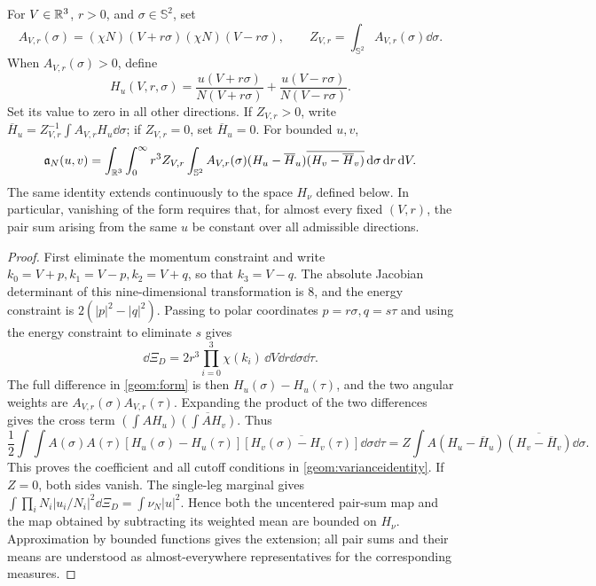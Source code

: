 \begin{proposition}\label{geom:pairedvariance}
For $V\in\mathbb R^3$, $r>0$, and $\sigma\in\mathbb S^2$, set
\[
 A_{V,r}(\sigma)=(\chi N)(V+r\sigma)(\chi N)(V-r\sigma),
 \qquad Z_{V,r}=\int_{\mathbb S^2}A_{V,r}(\sigma)\dd\sigma.
\]
When $A_{V,r}(\sigma)>0$, define
\[
 H_u(V,r,\sigma)=\frac{u(V+r\sigma)}{N(V+r\sigma)}
                         +\frac{u(V-r\sigma)}{N(V-r\sigma)}.
\]
Set its value to zero in all other directions. If $Z_{V,r}>0$, write
$\overline H_u=Z_{V,r}^{-1}\int A_{V,r}H_u\dd\sigma$;
if $Z_{V,r}=0$, set $\overline H_u=0$.
For bounded $u,v$,
\begin{equation}\label{geom:varianceidentity}
 \mathfrak a_N(u,v)=
 \int_{\mathbb R^3}\int_0^\infty r^3Z_{V,r}
       \int_{\mathbb S^2}A_{V,r}(\sigma)
       (H_u-\overline H_u)\overline{(H_v-\overline H_v)}
                    \,\mathrm d\sigma\,\mathrm d r\,\mathrm d V.
\end{equation}
The same identity extends continuously to the space $H_\nu$ defined below.
In particular, vanishing of the form requires that, for almost every fixed
$(V,r)$, the pair sum arising from the same $u$ be constant over all
admissible directions.
\end{proposition}
\begin{proof}
First eliminate the momentum constraint and write
$k_0=V+p,k_1=V-p,k_2=V+q$, so that $k_3=V-q$.
The absolute Jacobian determinant of this nine-dimensional transformation
is $8$, and the energy constraint is $2(|p|^2-|q|^2)$.
Passing to polar coordinates $p=r\sigma,q=s\tau$ and using the energy
constraint to eliminate $s$ gives
\[
 \dd\Xi_D=2r^3\prod_{i=0}^3\chi(k_i)\,
                      \dd V\dd r\dd\sigma\dd\tau.
\]
The full difference in \eqref{geom:form} is then
$H_u(\sigma)-H_u(\tau)$, and the two angular weights are
$A_{V,r}(\sigma)A_{V,r}(\tau)$. Expanding the product of the two differences
gives the cross term $(\int AH_u)\overline{(\int AH_v)}$. Thus
\[
 \frac12\int\!\!\int A(\sigma)A(\tau)
       [H_u(\sigma)-H_u(\tau)]
       \overline{[H_v(\sigma)-H_v(\tau)]}\dd\sigma\dd\tau
   =Z\int A(H_u-\overline H_u)
                 \overline{(H_v-\overline H_v)}\dd\sigma.
\]
This proves the coefficient and all cutoff conditions in
\eqref{geom:varianceidentity}. If $Z=0$, both sides vanish.
The single-leg marginal gives
$\int\prod_iN_i|u_i/N_i|^2\dd\Xi_D=\int\nu_N|u|^2$.
Hence both the uncentered pair-sum map and the map obtained by subtracting
its weighted mean are bounded on $H_\nu$. Approximation by bounded functions
gives the extension; all pair sums and their means are understood as
almost-everywhere representatives for the corresponding measures.
\end{proof}

